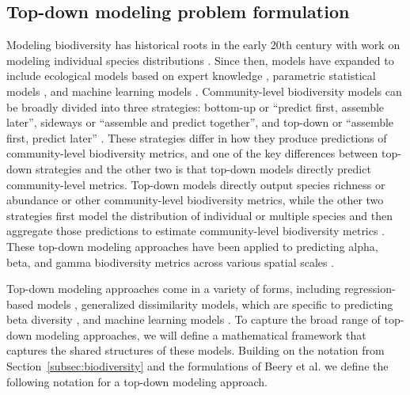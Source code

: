 \subsection{Top-down modeling problem formulation}\label{subsec:modeling-definition}

Modeling biodiversity has historical roots in the early 20th century with work on modeling individual species distributions \parencite{grinnell_1904}. Since then, models have expanded to include ecological models based on expert knowledge \parencite{beery2021}, parametric statistical models \parencite{guisan2002}, and machine learning models \parencite{ozkan_tumer_two_2026}. Community-level biodiversity models can be broadly divided into three strategies: bottom-up or ``predict first, assemble later'', sideways or ``assemble and predict together'', and top-down or ``assemble first, predict later'' \parencite{ferrier2006, pollock2020}. These strategies differ in how they produce predictions of community-level biodiversity metrics, and one of the key differences between top-down strategies and the other two is that top-down models directly predict community-level metrics. Top-down models directly output species richness or abundance or other community-level biodiversity metrics, while the other two strategies first model the distribution of individual or multiple species and then aggregate those predictions to estimate community-level biodiversity metrics \parencite{pollock2020}. These top-down modeling approaches have been applied to predicting alpha, beta, and gamma biodiversity metrics across various spatial scales \parencite{zhang2019, hoskins2020, mondal2021, andermann2022}.

Top-down modeling approaches come in a variety of forms, including regression-based models \parencite{mondal2021}, generalized dissimilarity models, which are specific to predicting beta diversity \parencite{ferrier2007, zhang2019, hoskins2020}, and machine learning models \parencite{andermann2022}. To capture the broad range of top-down modeling approaches, we will define a mathematical framework that captures the shared structures of these models. Building on the notation from Section~\ref{subsec:biodiversity} and the formulations of Beery et al. \parencite{beery2021} we define the following notation for a top-down modeling approach. 

